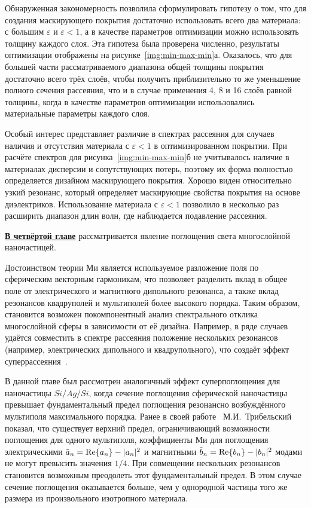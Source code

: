 Обнаруженная закономерность позволила сформулировать гипотезу о том,
что для создания маскирующего покрытия достаточно использовать всего
два материала: с большим $\varepsilon$ и ${\varepsilon<1}$, а в
качестве параметров оптимизации можно использовать толщину каждого
слоя. Эта гипотеза была проверена численно, результаты оптимизации
отображены на рисунке~\ref{img:min-max-min}а. Оказалось, что для
большей части рассматриваемого диапазона общей толщины покрытия 
достаточно всего трёх слоёв, чтобы получить приблизительно то же
уменьшение полного сечения рассеяния, что и в случае применения 4, 8 и
16 слоёв равной толщины, когда в качестве параметров оптимизации
использовались материальные параметры каждого слоя.

Особый интерес представляет различие в спектрах рассеяния для случаев
наличия и отсутствия материала с ${\varepsilon<1}$ в оптимизированном
покрытии.  При расчёте спектров для рисунка~\ref{img:min-max-min}б не
учитывалось наличие в материалах дисперсии и сопутствующих потерь,
поэтому их форма полностью определяется дизайном маскирующего
покрытия. Хорошо виден относительно узкий резонанс, который определяет
маскирующие свойства покрытия на основе диэлектриков. Использование
материала с ${\varepsilon<1}$ позволило в несколько раз расширить
диапазон длин волн, где наблюдается подавление рассеяния. 


\underline{\textbf{В четвёртой главе}} рассматривается явление
поглощения света многослойной наночастицей.

Достоинством теории Ми является используемое разложение поля по
сферическим векторным гармоникам, что позволяет разделить вклад в
общее поле от электрического и магнитного дипольного резонанса, а
также вклад резонансов квадруполей и мультиполей более высокого
порядка. Таким образом, становится возможен покомпонентный анализ
спектрального отклика многослойной сферы в зависимости от её
дизайна. Например, в ряде случаев удаётся совместить в спектре
рассеяния положение нескольких резонансов (например, электрических
дипольного и квадрупольного), что создаёт эффект
суперрассеяния~\cite{Fan-2010,Fan-2011}.

В данной главе был рассмотрен аналогичный эффект суперпоглощения
для наночастицы $Si/Ag/Si$, когда сечение поглощения сферической
наночастицы превышает фундаментальный предел поглощения резонансно
возбуждённого мультиполя максимального порядка. Ранее в своей
работе~\cite{Tribelsky-2011} М.И.~Трибельский показал, что существует
верхний предел, ограничивающий возможности поглощения для одного
мультиполя, коэффициенты Ми для поглощения электрическими
$\tilde{a}_n= {\rm Re}\{a_n\} - |a_n|^2 $ и магнитными
$\tilde{b}_n= {\rm Re}\{b_n\} - |b_n|^2 $ модами не могут превысить
значения $1/4$.  При совмещении нескольких резонансов становится
возможным преодолеть этот фундаментальный предел. В этом случае
сечение поглощения оказывается больше, чем у однородной частицы того
же размера из произвольного изотропного материала.

